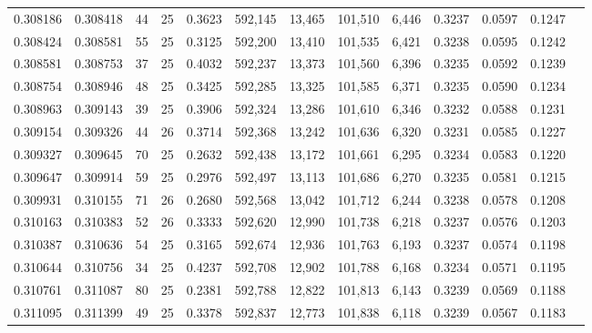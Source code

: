 \begin{tabular}{rrrrrrrrrrrrr}
0.308186 & 0.308418 &  44 &  25 &                                     0.3623 & 592,145 &  13,465 & 101,510 &   6,446 & 0.3237 & 0.0597 & 0.1247 \\
0.308424 & 0.308581 &  55 &  25 &                                     0.3125 & 592,200 &  13,410 & 101,535 &   6,421 & 0.3238 & 0.0595 & 0.1242 \\
0.308581 & 0.308753 &  37 &  25 &                                     0.4032 & 592,237 &  13,373 & 101,560 &   6,396 & 0.3235 & 0.0592 & 0.1239 \\
0.308754 & 0.308946 &  48 &  25 &                                     0.3425 & 592,285 &  13,325 & 101,585 &   6,371 & 0.3235 & 0.0590 & 0.1234 \\
0.308963 & 0.309143 &  39 &  25 &                                     0.3906 & 592,324 &  13,286 & 101,610 &   6,346 & 0.3232 & 0.0588 & 0.1231 \\
0.309154 & 0.309326 &  44 &  26 &                                     0.3714 & 592,368 &  13,242 & 101,636 &   6,320 & 0.3231 & 0.0585 & 0.1227 \\
0.309327 & 0.309645 &  70 &  25 &                                     0.2632 & 592,438 &  13,172 & 101,661 &   6,295 & 0.3234 & 0.0583 & 0.1220 \\
0.309647 & 0.309914 &  59 &  25 &                                     0.2976 & 592,497 &  13,113 & 101,686 &   6,270 & 0.3235 & 0.0581 & 0.1215 \\
0.309931 & 0.310155 &  71 &  26 &                                     0.2680 & 592,568 &  13,042 & 101,712 &   6,244 & 0.3238 & 0.0578 & 0.1208 \\
0.310163 & 0.310383 &  52 &  26 &                                     0.3333 & 592,620 &  12,990 & 101,738 &   6,218 & 0.3237 & 0.0576 & 0.1203 \\
0.310387 & 0.310636 &  54 &  25 &                                     0.3165 & 592,674 &  12,936 & 101,763 &   6,193 & 0.3237 & 0.0574 & 0.1198 \\
0.310644 & 0.310756 &  34 &  25 &                                     0.4237 & 592,708 &  12,902 & 101,788 &   6,168 & 0.3234 & 0.0571 & 0.1195 \\
0.310761 & 0.311087 &  80 &  25 &                                     0.2381 & 592,788 &  12,822 & 101,813 &   6,143 & 0.3239 & 0.0569 & 0.1188 \\
0.311095 & 0.311399 &  49 &  25 &                                     0.3378 & 592,837 &  12,773 & 101,838 &   6,118 & 0.3239 & 0.0567 & 0.1183 \\

\end{tabular}
